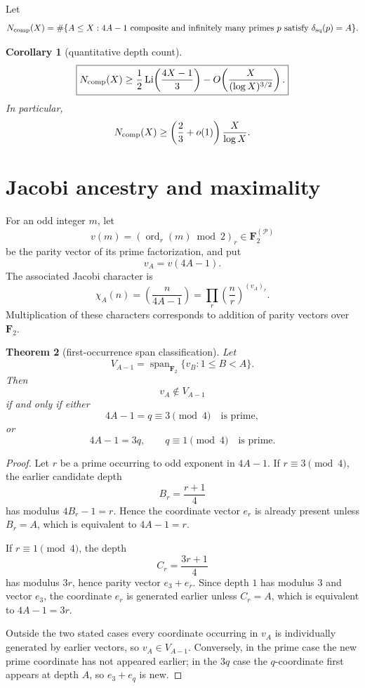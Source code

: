 \documentclass[11pt]{article}
\newtheorem{theorem}{Theorem}
\newtheorem{corollary}[theorem]{Corollary}
\theoremstyle{definition}
\newcommand{\sqdepth}{\delta_{\rm sq}}
\begin{document}
Let
\[
N_{\rm comp}(X)=\#\{A\le X:4A-1\text{ composite and infinitely many primes }p
\text{ satisfy }\sqdepth(p)=A\}.
\]

\begin{corollary}[quantitative depth count]\label{cor:count}
\[
\boxed{
N_{\rm comp}(X)
\ge
\frac12\operatorname{Li}\!\left(\frac{4X-1}{3}\right)
-O\!\left(\frac{X}{(\log X)^{3/2}}\right).
}
\]
In particular,
\[
N_{\rm comp}(X)
\ge\left(\frac23+o(1)\right)\frac{X}{\log X}.
\]
\end{corollary}

\section{Jacobi ancestry and maximality}
For an odd integer $m$, let
\[
v(m)=(\operatorname{ord}_r(m)\bmod2)_r
\in\mathbf F_2^{(\mathcal P)}
\]
be the parity vector of its prime factorization, and put
\[
v_A=v(4A-1).
\]
The associated Jacobi character is
\[
\chi_A(n)=\left(\frac{n}{4A-1}\right)
=\prod_r\left(\frac nr\right)^{(v_A)_r}.
\]
Multiplication of these characters corresponds to addition of parity vectors over $\mathbf F_2$.

\begin{theorem}[first-occurrence span classification]\label{thm:span}
Let
\[
V_{A-1}=\operatorname{span}_{\mathbf F_2}\{v_B:1\le B<A\}.
\]
Then
\[
\boxed{v_A\notin V_{A-1}}
\]
if and only if either
\[
4A-1=q\equiv3\pmod4\quad\text{is prime},
\]
or
\[
4A-1=3q,
\qquad q\equiv1\pmod4\quad\text{is prime}.
\]
\end{theorem}

\begin{proof}
Let $r$ be a prime occurring to odd exponent in $4A-1$. If $r\equiv3\pmod4$, the earlier candidate depth
\[
B_r=\frac{r+1}{4}
\]
has modulus $4B_r-1=r$. Hence the coordinate vector $e_r$ is already present unless $B_r=A$, which is equivalent to $4A-1=r$.

If $r\equiv1\pmod4$, the depth
\[
C_r=\frac{3r+1}{4}
\]
has modulus $3r$, hence parity vector $e_3+e_r$. Since depth $1$ has modulus $3$ and vector $e_3$, the coordinate $e_r$ is generated earlier unless $C_r=A$, which is equivalent to $4A-1=3r$.

Outside the two stated cases every coordinate occurring in $v_A$ is individually generated by earlier vectors, so $v_A\in V_{A-1}$. Conversely, in the prime case the new prime coordinate has not appeared earlier; in the $3q$ case the $q$-coordinate first appears at depth $A$, so $e_3+e_q$ is new.
\end{proof}
\end{document}
